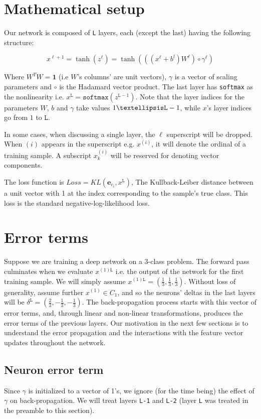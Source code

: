 \documentclass[]{article}
\begin{document}
 	\section{Mathematical setup}
 		Our network is composed of \texttt{L} layers, each (except the last) having the following structure:
 		
 		$$x^{\ell+1} = \tanh(z^\ell) = \tanh(((x^\ell+b^l)W^\ell)\circ \gamma^\ell)$$
 		
 		Where $W^T W=\mathbf{1}$ (i.e $W$'s columns' are unit vectors), $\gamma$ is a vector of scaling parameters and $\circ$ is the Hadamard vector product. The last layer has \texttt{softmax} as the nonlinearity i.e. 
 		$x^\mathtt{L} = \mathtt{softmax}(z^{\mathtt{L}-1})$. 
 		Note that the layer indices for the parameters $W$, $b$ and $\gamma$ take values $1\textellipsis\mathtt{L} -1$, while $x$'s layer indices go from $1$ to $\mathtt{L}$.
 		
 		In some cases, when discussing a single layer, the $\ell$ superscript will be dropped. When $(i)$ appears in the superscript e.g. $x^{(i)}$, it will denote the ordinal of a training sample. A subscript $x^{(i)}_k$ will be reserved for denoting vector components.
 		
 		
 		The loss function is $Loss=KL(\mathbf{e}_{c_i},x^\mathtt{L})$, The Kullback-Leiber distance between a unit vector with 1 at the index corresponding to the sample's true class. This loss is the standard negative-log-likelihood loss.
 		
 		
 	\section{Error terms}
 		Suppose we are training a deep network on a 3-class problem. The forward pass culminates when we evaluate $x^{(1)\textsf{L} }$ i.e. the output of the network for the first training sample. We will simply assume $x^{(1)\mathtt{L} } = \left(\frac{1}{3},\frac{1}{3},\frac{1}{3}\right)$. Without loss of generality, assume further $x^{(1)} \in C_1$, and so the neurons' deltas in the last layers will be  $\delta^{\mathtt{L}}=\left(\frac{2}{3},-\frac{1}{3},-\frac{1}{3}\right)$. 
 		The back-propagation process starts with this vector of error terms, and, through linear and non-linear transformations, produces the error terms of the previous layers. Our motivation in the next few sections is to understand the error propagation and the interactions with the feature vector updates throughout the network. 
	
	\subsection{Neuron error term}
 		Since $\gamma$ is initialized to a vector of 1's, we ignore (for the time being) the effect of $\gamma$ on back-propagation. We will treat layers \texttt{L-1} and \texttt{L-2} (layer \texttt{L} was treated in the preamble to this section).
 		
\end{document}
